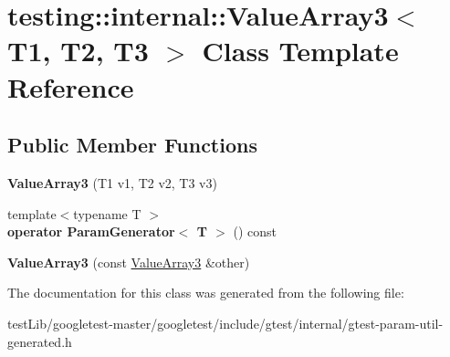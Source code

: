 \hypertarget{classtesting_1_1internal_1_1ValueArray3}{}\section{testing\+:\+:internal\+:\+:Value\+Array3$<$ T1, T2, T3 $>$ Class Template Reference}
\label{classtesting_1_1internal_1_1ValueArray3}
\subsection*{Public Member Functions}
\begin{DoxyCompactItemize}
\item 
\mbox{\label{classtesting_1_1internal_1_1ValueArray3_aa83b0671fed7a231ba127600c904246d}} 
{\bfseries Value\+Array3} (T1 v1, T2 v2, T3 v3)
\item 
\mbox{\label{classtesting_1_1internal_1_1ValueArray3_a4922d1cf7af801e82bdead15817b23fc}} 
{\footnotesize template$<$typename T $>$ }\\{\bfseries operator Param\+Generator$<$ T $>$} () const
\item 
\mbox{\label{classtesting_1_1internal_1_1ValueArray3_a742d8b00de6b63b020740ebbc7bc8d31}} 
{\bfseries Value\+Array3} (const \hyperlink{classtesting_1_1internal_1_1ValueArray3}{Value\+Array3} \&other)
\end{DoxyCompactItemize}


The documentation for this class was generated from the following file\+:\begin{DoxyCompactItemize}
\item 
test\+Lib/googletest-\/master/googletest/include/gtest/internal/gtest-\/param-\/util-\/generated.\+h\end{DoxyCompactItemize}
